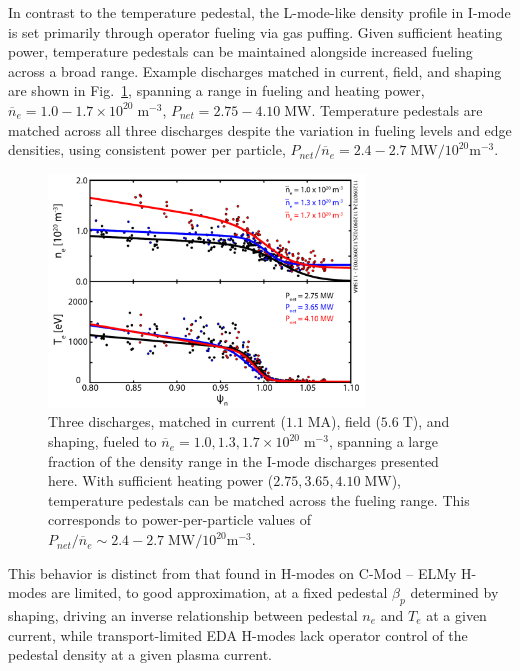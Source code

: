 \documentclass[12pt]{iopart}
\begin{document}
In contrast to the temperature pedestal, the L-mode-like density profile in I-mode is set primarily through operator fueling via gas puffing.
Given sufficient heating power, temperature pedestals can be maintained alongside increased fueling across a broad range.
Example discharges matched in current, field, and shaping are shown in Fig.~\ref{fig:fuelingprofiles}, spanning a range in fueling and heating power, $\overline{n}_e = 1.0-1.7\times10^{20} \;\mbox{m}^{-3}$, $P_{net} = 2.75-4.10\;\mbox{MW}$.  
Temperature pedestals are matched across all three discharges despite the variation in fueling levels and edge densities, using consistent power per particle, $P_{net}/\overline{n}_e = 2.4-2.7\;\mbox{MW}/10^{20}\mbox{m}^{-3}$.

\begin{figure}[ht]
 \centering
 \includegraphics[width=0.75\textwidth]{fuelingprofiles.pdf}
 \caption{Three discharges, matched in current ($1.1\;\mbox{MA}$), field ($5.6\;\mbox{T}$), and shaping, fueled to $\overline{n}_e = 1.0, 1.3, 1.7 \times 10^{20} \;\mbox{m}^{-3}$, spanning a large fraction of the density range in the I-mode discharges presented here.  With sufficient heating power ($2.75, 3.65, 4.10 \;\mbox{MW}$), temperature pedestals can be matched across the fueling range.  This corresponds to power-per-particle values of $P_{net}/\overline{n}_e \sim 2.4-2.7 \;\mbox{MW}/10^{20}\mbox{m}^{-3}$.}
 \label{fig:fuelingprofiles}
\end{figure}

This behavior is distinct from that found in H-modes on C-Mod -- ELMy H-modes are limited, to good approximation, at a fixed pedestal $\beta_p$ determined by shaping, driving an inverse relationship between pedestal $n_e$ and $T_e$ at a given current, while transport-limited EDA H-modes lack operator control of the pedestal density at a given plasma current.
\end{document}
